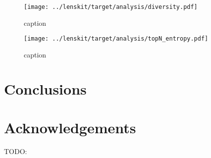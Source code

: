 \documentclass[letterpaper]{sig-alternate}
\begin{document}
\begin{figure}
\centering
\texttt{[image: ../lenskit/target/analysis/diversity.pdf]}
\caption{caption}
\label{fig:diversity}
\end{figure}

\begin{figure}
\centering
\texttt{[image: ../lenskit/target/analysis/topN\_entropy.pdf]}
\caption{caption}
\label{fig:spread}
\end{figure}









\section{Conclusions}

\section{Acknowledgements}
 \cite{harper2005economic}
 TODO:


\end{document}
